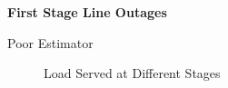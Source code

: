 \textbf{First Stage Line Outages}

Poor Estimator
\begin{figure}
\centering

 \caption{Load Served at Different Stages}\label{fig:loadserve}
\end{figure}



